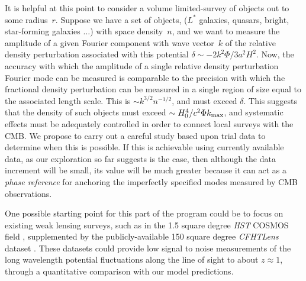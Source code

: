 \documentclass[psfig,12pt]{article}
\def\ni{\noindent}
\begin{document}
{It is helpful at this point to consider a volume limited-survey of
objects out to some radius~$r$. Suppose we have a set of objects,
($L^\ast$ galaxies, quasars, bright, star-forming galaxies $\dots$) with
space density~$n$, and we want to measure the amplitude of a given
Fourier component with wave vector~$k$ of the relative density
perturbation associated with this potential
$\delta\sim-2k^2\Phi/3a^2H^2$. Now, the accuracy with which the amplitude
of a single relative density perturbation Fourier mode can be measured
is comparable to the precision with which the fractional density
perturbation can be measured in a single region of size equal to the
associated length scale. This is $\sim k^{3/2}n^{-1/2}$, and must exceed
$\delta$. This suggests that the density of such objects must exceed
$\sim H_0^4/c^2\Phi k_{\rm max}$,
and systematic effects must be adequately controlled in order to connect
local surveys with the CMB. We propose to carry out a careful study
based upon trial data to determine when this  is possible.
If this is achievable
using currently available data, as our exploration so far suggests is the case,
then although the data increment will be small, its value
will be much greater because it can act as a {\it phase reference} for
anchoring the imperfectly specified modes measured by CMB observations.

One possible starting point for this part of the program could be to
focus on existing weak lensing surveys, such as in the 1.5 square degree
{\it HST} COSMOS field \cite{MasseyEtal2007}, supplemented by the
publicly-available 150 square degree {\it CFHTLens} dataset
\cite{HeymansEtal2012}. These datasets could provide
low signal to noise measurements of the long wavelength potential
fluctuations along the line of sight to about $z \approx 1$,
through  a quantitative comparison with our model predictions.



}
\end{document}
